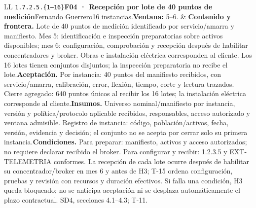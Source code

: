 \begin{longtable}{L{\tabcolsep\relax}L{\tabcolsep\relax}}
\texttt{1.\allowbreak{}7.\allowbreak{}2.\allowbreak{}5.\allowbreak{}\{1--16\}}\newline{}\textbf{F04 · Recepción por lote de 40 puntos de medición}\newline{}Fernando Guerrero\newline{}16 instancias.\newline{}\textbf{Ventana:} 5--6. & \textbf{Contenido y frontera.} Lote de 40 puntos de medición identificado por servicio/amarra y manifiesto. Mes 5: identificación e inspección preparatorias sobre activos disponibles; mes 6: configuración, comprobación y recepción después de habilitar concentradores y broker. Obras e instalación eléctrica corresponden al cliente. Los 16 lotes tienen conjuntos disjuntos; la inspección preparatoria no recibe el lote.\newline{}\textbf{Aceptación.} Por instancia: 40 puntos del manifiesto recibidos, con servicio/amarra, calibración, error, flexión, tiempo, corte y lectura trazados. Cierre agregado: 640 puntos únicos al recibir los 16 lotes; la instalación eléctrica corresponde al cliente.\newline{}\textbf{Insumos.} Universo nominal/manifiesto por instancia, versión y política/protocolo aplicable recibidos, responsables, acceso autorizado y ventana admisible. Registro de instancia: código, población/activos, fecha, versión, evidencia y decisión; el conjunto no se acepta por cerrar solo su primera instancia.\newline{}\textbf{Condiciones.} Para preparar: manifiesto, activos y acceso autorizados; no requiere declarar recibido el broker. Para configurar y recibir: 1.2.3.5 y EXT-TELEMETRIA conformes. La recepción de cada lote ocurre después de habilitar su concentrador/broker en mes 6 y antes de H3; T-15 ordena configuración, pruebas y revisión con recursos y duración efectivos. Si falla una condición, H3 queda bloqueado; no se anticipa aceptación ni se desplaza automáticamente el plazo contractual. SD4, secciones 4.1--4.3; T-11.\\\hline

\end{longtable}
